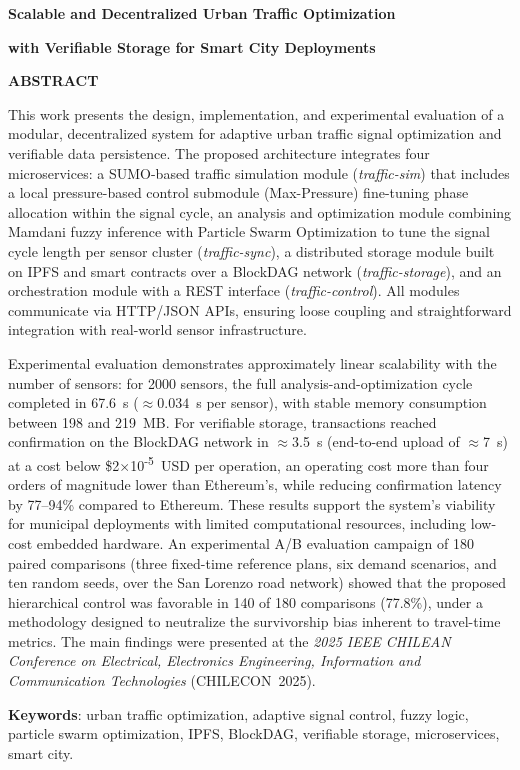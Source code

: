 \centerline{\textbf{\large Scalable and Decentralized Urban Traffic Optimization}}
\centerline{\textbf{\large with Verifiable Storage for Smart City Deployments}}

\vspace{2cm}

\vspace{0.5cm}

\vspace{0.5cm}

\noindent
\textbf{ABSTRACT}

\vspace{0.5cm}

\noindent
This work presents the design, implementation, and experimental evaluation of a modular,
decentralized system for adaptive urban traffic signal optimization and verifiable data
persistence. The proposed architecture integrates four microservices: a SUMO-based traffic
simulation module (\textit{traffic-sim}) that includes a local pressure-based control
submodule (Max-Pressure) fine-tuning phase allocation within the signal cycle, an analysis and optimization module combining
Mamdani fuzzy inference with Particle Swarm Optimization to tune the signal cycle length
per sensor cluster (\textit{traffic-sync}), a
distributed storage module built on IPFS and smart contracts over a BlockDAG network
(\textit{traffic-storage}), and an orchestration module with a REST interface
(\textit{traffic-control}). All modules communicate via HTTP/JSON APIs, ensuring loose
coupling and straightforward integration with real-world sensor infrastructure.

Experimental evaluation demonstrates approximately linear scalability with the number of
sensors: for 2000 sensors, the full analysis-and-optimization cycle completed in 67.6~s
($\approx 0.034$~s per sensor), with stable memory consumption between 198 and 219~MB.
For verifiable storage, transactions reached confirmation on the BlockDAG network in
$\approx$3.5~s (end-to-end upload of $\approx$7~s) at a cost below \$2$\times$10\textsuperscript{-5}~USD per operation,
an operating cost more than four orders of magnitude lower than Ethereum's, while
reducing confirmation latency by 77--94\% compared to Ethereum.
These results support the system's viability for municipal deployments with limited
computational resources, including low-cost embedded hardware. An experimental A/B
evaluation campaign of 180 paired comparisons (three fixed-time reference plans, six
demand scenarios, and ten random seeds, over the San Lorenzo road network) showed that
the proposed hierarchical control was favorable in 140 of 180 comparisons (77.8\%),
under a methodology designed to neutralize the survivorship bias inherent to travel-time
metrics. The main findings were
presented at the \textit{2025 IEEE CHILEAN Conference on Electrical, Electronics
Engineering, Information and Communication Technologies} (CHILECON~2025).

\vspace{0.5cm}

\noindent
\textbf{Keywords}: urban traffic optimization, adaptive signal control, fuzzy logic,
particle swarm optimization, IPFS, BlockDAG, verifiable storage, microservices,
smart city.
